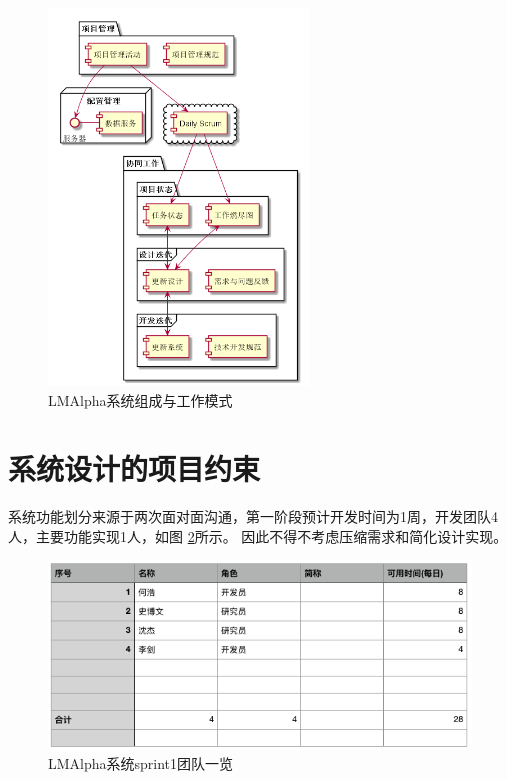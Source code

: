 \begin{figure}[ht]
    \centering
    \includegraphics[height=10cm]{system_structure.png}
    \caption{LMAlpha系统组成与工作模式}
    \label{fig:s1-system_structure}
\end{figure}



\section{系统设计的项目约束}

系统功能划分来源于两次面对面沟通，第一阶段预计开发时间为1周，开发团队4人，主要功能实现1人，如图
\ref{fig:s1-teamview}所示。
因此不得不考虑压缩需求和简化设计实现。 \\

\begin{figure}[ht]
\centering
\includegraphics[width=14cm]{sprint1-teamview.png}
\caption{LMAlpha系统sprint1团队一览}
\label{fig:s1-teamview}
\end{figure}

